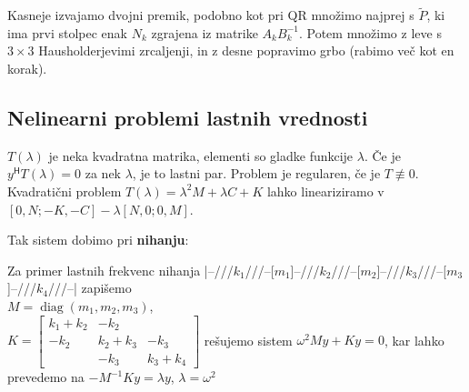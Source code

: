 \documentclass[a4paper,10pt]{article}
\theoremstyle{definition}
\renewcommand{\H}{\mathsf{H}\!}
\DeclareMathOperator{\diag}{diag}
\begin{document}
Kasneje izvajamo dvojni premik, podobno kot pri QR množimo najprej s
$\tilde{P}$, ki ima prvi stolpec enak $N_k$ zgrajena iz matrike $A_kB_k^{-1}$.
Potem množimo z leve s $3 \times 3$ Hausholderjevimi zrcaljenji, in z desne
popravimo grbo (rabimo več kot en korak).

\subsection*{Nelinearni problemi lastnih vrednosti}
$T(\lambda)$ je neka kvadratna matrika, elementi so gladke funkcije $\lambda$.
Če je $y^\H T(\lambda) = 0$ za nek $\lambda$, je to lastni par. Problem je
regularen, če je $T \not\equiv 0$. Kvadratični problem $T(\lambda) = \lambda^2M +
\lambda C + K$ lahko lineariziramo v $[0,N; -K,-C] - \lambda[N,0; 0,M]$.

Tak sistem dobimo pri \textbf{nihanju}:

Za primer lastnih frekvenc nihanja
|--///$k_1$///--[$m_1$]--///$k_2$///--[$m_2$]--///$k_3$///--[$m_3$]--///$k_4$///--| zapišemo \\
$M=\diag(m_1,m_2,m_3)$,\\
$ K=
\begin{bmatrix}
k_1+k_2 & -k_2&\\-k_2 & k_2+k_3 & -k_3\\ &-k_3&k_3+k_4
\end{bmatrix}$
rešujemo sistem $\omega^2My+Ky=0$, kar lahko prevedemo na
$-M^{-1}Ky=\lambda y$, $\lambda=\omega^2$
\end{document}
